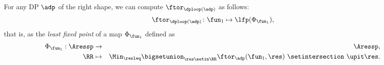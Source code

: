 \begin{theorem}
    \label{prop:loop-continuous}
    For any DP $\adp$ of the right shape, we can compute $ \ftor_{\dploop(\adp)}$ 
    as follows:
    \begin{equation}\label{eq:loop_fixpoint}
        \ftor_{\dploop(\adp)}\colon\fun_{1}\mapsto\lfp(\Phi_{\fun_{1}}),
    \end{equation}
    that is, as the \emph{least fixed point} of a map $\Phi_{\fun_{1}}$ defined as 
    \begin{eqnarray}
        \Phi_{\fun_{1}}:\Aressp & \to     & \Aressp,\label{eq:bigphi} \\
         \RR                     & \mapsto & \Min_{\resleq}\bigsetunion_{\res\setin\RR}\ftor_{\adp}(\fun_{1}, \res)\ \setintersection\ \upit\res.\nonumber
    \end{eqnarray}
\end{theorem}

